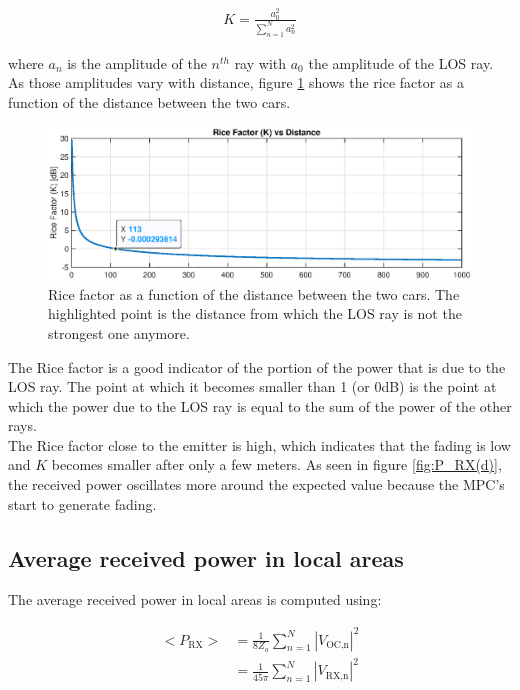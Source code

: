 \documentclass[10pt,a4paper]{ULBreport}
\begin{document}
\begin{align*}
    K = \frac{a_0^2}{\sum_{n=1}^{N}a_n^2}
\end{align*}

where $a_n$ is the amplitude of the $n^{th}$ ray with $a_0$ the amplitude of the LOS ray. As those amplitudes vary with distance, figure \ref{fig:K(d)} shows the rice factor as a function of the distance between the two cars. 

\begin{figure}[H]
    \centering
    \includegraphics[width=1\textwidth]{3_4.eps}
    \caption{Rice factor as a function of the distance between the two cars. The highlighted point is the distance from which the LOS ray is not the strongest one anymore.}
    \label{fig:K(d)}
\end{figure}

The Rice factor is a good indicator of the portion of the power that is due to the LOS ray. The point at which it becomes smaller than 1 (or 0dB) is the point at which the power due to the LOS ray is equal to the sum of the power of the other rays. \\
The Rice factor close to the emitter is high, which indicates that the fading is low and $K$ becomes smaller after only a few meters. As seen in figure \ref{fig:P_RX(d)}, the received power oscillates more around the expected value because the MPC's start to generate fading.\\

\subsection{Average received power in local areas}
The average received power in local areas is computed using:
\vspace{-1cm}

\begin{align}
    <P_{\text{RX}}> &= \frac{1}{8 Z_a} \sum_{n=1}^{N} \left| V_{\text{OC,n}} \right|^2\\
    &= \frac{1}{45\pi} \sum_{n=1}^{N} \left| V_{\text{RX,n}} \right|^2
    \label{eq:average_power}
\end{align}
\vspace{-1cm}
\end{document}
